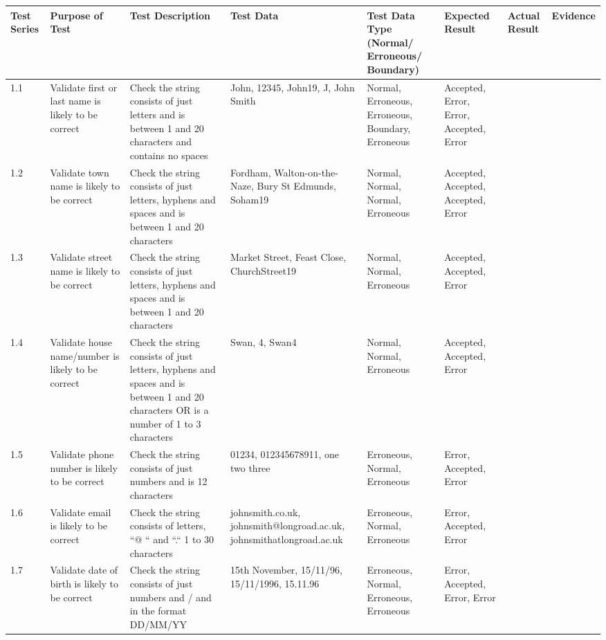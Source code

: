 {\begin{landscape}
\begin{center}
    \begin{longtable}{|p{1.5cm}|p{2.5cm}|p{2.5cm}|p{2cm}|p{2cm}|p{2cm}|p{2cm}|p{2cm}|}
        \hline
        \textbf{Test Series} & \textbf{Purpose of Test} & \textbf{Test Description} & \textbf{Test Data} & \textbf{Test Data Type (Normal/ Erroneous/ Boundary)} & \textbf{Expected Result} & \textbf{Actual Result} & \textbf{Evidence}\\ \hline
        1.1 & Validate first or last name is likely to be correct & Check the string consists of just letters and is between 1 and 20 characters and contains no spaces & John, 12345, John19, J, John Smith & Normal, Erroneous, Erroneous, Boundary, Erroneous & Accepted, Error, Error, Accepted, Error & \\ \hline
        1.2 & Validate town name is likely to be correct & Check the string consists of just letters, hyphens and spaces and is between 1 and 20 characters & Fordham, Walton-on-the-Naze, Bury St Edmunds, Soham19 & Normal, Normal, Normal, Erroneous & Accepted, Accepted, Accepted, Error & \\ \hline
        1.3 & Validate street name is likely to be correct & Check the string consists of just letters, hyphens and spaces and is between 1 and 20 characters & Market Street, Feast Close, ChurchStreet19 & Normal, Normal, Erroneous & Accepted, Accepted, Error & \\ \hline
        1.4 & Validate house name/number is likely to be correct & Check the string consists of just letters, hyphens and spaces and is between 1 and 20 characters OR is a number of 1 to 3 characters & Swan, 4, Swan4 & Normal, Normal, Erroneous & Accepted, Accepted, Error & \\ \hline
        1.5 & Validate phone number is likely to be correct & Check the string consists of just numbers and is 12 characters & 01234, 012345678911, one two three & Erroneous, Normal, Erroneous & Error, Accepted, Error & \\ \hline
        1.6 & Validate email is likely to be correct & Check the string consists of letters, ``@ `` and ``.`` 1 to  30 characters & johnsmith.co.uk, johnsmith@longroad.ac.uk, johnsmithatlongroad.ac.uk & Erroneous, Normal, Erroneous & Error, Accepted, Error & \\ \hline
        1.7 & Validate date of birth is likely to be correct & Check the string consists of just numbers and / and in the format DD/MM/YY & 15th November, 15/11/96, 15/11/1996, 15.11.96 & Erroneous, Normal, Erroneous, Erroneous & Error, Accepted, Error, Error & \\ \hline

\end{longtable}
\end{center}
\end{landscape}}

